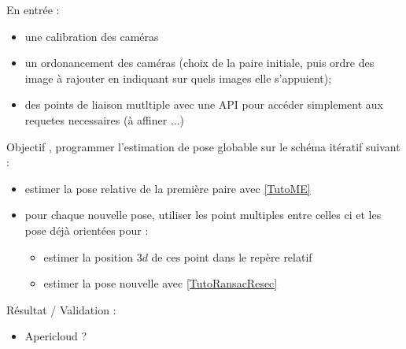 En entrée :

\begin{itemize}
    \item   une calibration des caméras
    \item   un ordonancement des caméras (choix de la paire initiale, puis ordre des image à rajouter en indiquant sur quels
	    images elle s'appuient);
    \item   des points de liaison mutltiple avec une API pour accéder simplement
	    aux requetes necessaires (à affiner ...) 
\end{itemize}


Objectif , programmer l'estimation de pose globable sur le schéma itératif suivant :

\begin{itemize}
    \item   estimer la pose relative de la première paire avec \ref{TutoME}
    \item   pour chaque nouvelle pose, utiliser les point multiples entre celles ci et les pose déjà orientées pour :

     \begin{itemize}
             
         \item   estimer la position $3d$ de ces point dans le repère relatif
         \item   estimer la pose nouvelle avec \ref{TutoRansacResec}
     \end{itemize}
\end{itemize}

Résultat / Validation :


\begin{itemize}
    \item   Apericloud ?
\end{itemize}





